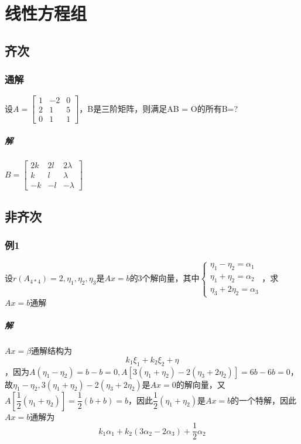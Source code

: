 \section{线性方程组}

\subsection{齐次}

\subsubsection{通解}
设\(A = \begin{bmatrix}
    1 & -2 & 0 \\ 
    2 & 1 & 5 \\ 
    0 & 1 & 1
\end{bmatrix}\)，B是三阶矩阵，则满足AB = O的所有B=?
\subparagraph{解}
\(B = \begin{bmatrix}
    2k & 2l & 2\lambda \\ 
    k & l & \lambda \\ 
    -k & -l & -\lambda
\end{bmatrix}\)

\subsection{非齐次}

\subsubsection{例1}
设\(r(A_{4 * 4}) = 2, \eta_1, \eta_2, \eta_3\)是\(Ax = b\)的3个解向量，其中\(\begin{cases}
\eta_1 - \eta_2 = \alpha_1 \\ 
\eta_1 + \eta_2 = \alpha_2 \\ 
\eta_3 + 2\eta_2 = \alpha_3
\end{cases}\)，求\(Ax = b\)通解

\subparagraph{解}
\(Ax = \beta\)通解结构为\[k_1\xi_1 + k_2\xi_2 + \eta\]，因为\(A(\eta_1 - \eta_2) = b - b = 0, A[3(\eta_1 + \eta_2) - 2(\eta_3 + 2\eta_2)] = 6b - 6b = 0\)，故\(\eta_1 - \eta_2, 3(\eta_1 + \eta_2) - 2(\eta_3 + 2\eta_2)\)是\(Ax = 0\)的解向量，又\(A[\dfrac{1}{2}(\eta_1 + \eta_2)] = \dfrac{1}{2}(b + b) = b\)，因此\(\dfrac{1}{2}(\eta_1 + \eta_2)\)是\(Ax = b\)的一个特解，因此\(Ax = b\)通解为\[k_1\alpha_1 + k_2(3\alpha_2 - 2\alpha_3) + \dfrac{1}{2}\alpha_2\]

